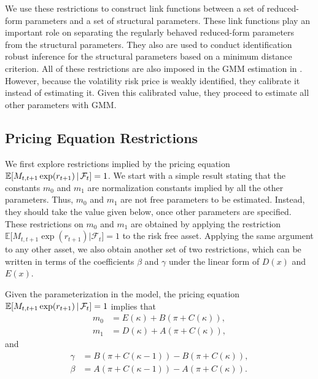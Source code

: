 \documentclass[11pt, letterpaper, twoside]{article}
\begin{document}
We use these restrictions to construct link functions between a set of reduced-form parameters and a set of structural parameters. These link functions play an important role on separating the regularly behaved reduced-form parameters from the structural parameters. They also are used to conduct identification robust inference for the structural parameters based on a minimum distance criterion.
All of these restrictions are also imposed in the GMM estimation in \textcite{han2018leverage}. However, because the volatility risk price is weakly identified, they calibrate it instead of estimating it. Given this calibrated value, they proceed to estimate all other parameters with GMM. 

\subsection{Pricing Equation Restrictions}

We first explore restrictions implied by the pricing equation $\operatorname{\mathbb{E}}[ M_{t,t+1}\exp (r_{t+1}) \,\vert\, \mathcal{F}_{t}]=1$. We start with a simple result stating that the constants $m_{0}$ and $m_{1}$ are normalization constants implied by all the other parameters. Thus, $m_{0}$ and $m_{1}$ are not free parameters to be estimated. Instead, they should take the value given below, once other parameters are specified. These restrictions on $m_{0}$ and $m_{1}$ are obtained by applying the restriction $\mathbb{E[} M_{t,t+1}\exp (r_{t+1})|\mathcal{F}_{t}]=1$ to the risk free asset. Applying the same argument to any other asset, we also obtain another set of two restrictions, which can be written in terms of the coefficients $\beta $ and $ \gamma $ under the linear form of $D(x)$ and $E(x)$.

\begin{lemma}
    \label{Lemma m0 and m1}
    Given the parameterization in the model, the pricing equation $\operatorname{\mathbb{E}}[M_{t,t+1}\exp (r_{t+1}) \,\vert\, \mathcal{F}_{t}]=1$ implies that 
%
    \begin{align*}
        m_{0} &= E(\kappa )+B\left( \pi +C\left( \kappa \right) \right) , \\
%
        m_{1} &= D\left( \kappa \right) +A\left( \pi +C\left( \kappa \right) \right) ,
    \end{align*}
    and
%
    \begin{align*}
        \gamma  &= B\left( \pi +C\left( \kappa -1\right) \right) -B\left( \pi +C\left( \kappa \right) \right), \\
        \beta  &= A\left( \pi +C\left( \kappa -1\right) \right) -A\left( \pi +C\left( \kappa \right) \right).
    \end{align*}
\end{lemma}
\end{document}
